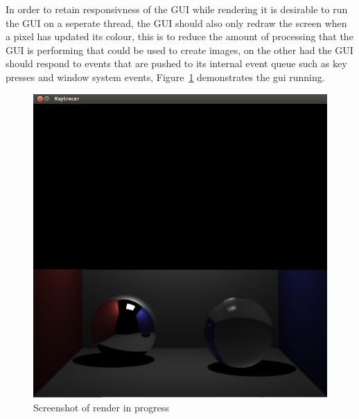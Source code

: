 In order to retain responsivness of the GUI while rendering it is desirable to run the GUI on a seperate thread, the GUI
should also only redraw the screen when a pixel has updated its colour, this is to reduce the amount of processing that
the GUI is performing that could be used to create images, on the other had the GUI should respond to events that are pushed
to its internal event queue such as key presses and window system events, Figure~\ref{fig:gui_screenshot} demonstrates the
gui running.

\begin{figure}[h]
\centering
\includegraphics[scale=0.24]{./images/gui_screenshot.png}
\caption{Screenshot of render in progress}
\label{fig:gui_screenshot}
\end{figure}
